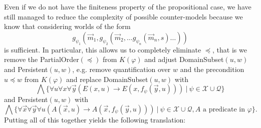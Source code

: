 \documentclass{easychair}
\theoremstyle{definition}
\theoremstyle{definition}
\theoremstyle{definition}
\theoremstyle{definition}
\theoremstyle{definition}
\theoremstyle{definition}
\theoremstyle{definition}
\begin{document}
Even if we do not have the finiteness property of the propositional case, we have still managed to reduce the complexity of possible counter-models because we know that considering worlds of the form $$g_{\psi_1}(\vec m_1, g_{\psi_2}(\vec m_2, \dots g_{\psi_n}(\vec m_n, s)\dots))$$ is sufficient.
In particular, this allows us to completely eliminate $\preceq$, that is we remove the PartialOrder$(\preceq)$
from $K(\varphi)$ and adjust DomainSubset$(u, w)$ and Persistent$(u, w)$, e.g. remove quantification over $w$ and the precondition $u\preceq w$ from $K(\varphi)$ and replace DomainSubset$(u, w)$ with
$$
	\bigwedge\{\forall u\forall x\forall\vec y(E(x, u)\to E(x, f_\psi(\vec y, u)))\:|\:\psi\in\mathcal X\cup\mathcal Q\}
$$
and Persistent$(u, w)$ with
$$
	\bigwedge\{\forall\vec x\forall\vec y\forall u(A(\vec x, u)\to A(\vec x, f_\psi(\vec y, u)))\:|\:\psi\in\mathcal X\cup\mathcal Q, \text{$A$ a predicate in $\varphi$}\}.
$$Putting all of this together yields the following translation:
\end{document}
